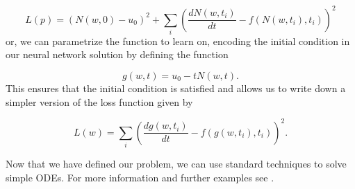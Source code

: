 \documentclass{CUP-JNL-DTM}%
\theoremstyle{definition}
\numberwithin{equation}{section}
\begin{document}
\begin{equation}
	L(p) = (N(w,0) - u_0)^2 + \sum_i \left( \frac{dN(w,t_i)}{dt} - f(N(w,t_i), t_i)\right)^2
\end{equation}
or, we can parametrize the function to learn on, encoding the initial condition in our neural network solution by defining the function 

\begin{equation}
	g(w,t) = u_0 - tN(w,t).
\end{equation}
This ensures that the initial condition is satisfied and allows us to write down a simpler version of the loss function given by 

\begin{equation}
	L(w) = \sum_i \left(\frac{dg(w,t_i)}{dt} - f(g(w,t_i), t_i)\right)^2. 
\end{equation}

Now that we have defined our problem, we can use standard techniques to solve simple ODEs. For more information and further examples see \cite{rackauckasSciMLSciMLBookParallel}. 
\end{document}
